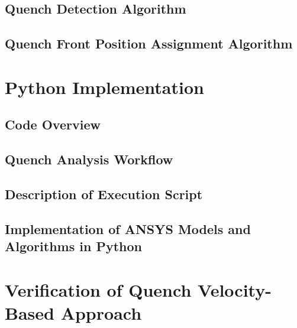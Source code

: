 \documentclass[11pt,a4paper]{report}
\begin{document}
\section{Quench Detection Algorithm}
\label{section:quench_detection_algorithm}


\section{Quench Front Position Assignment Algorithm}
\label{section:node_searching_algorithm}


\clearpage
\chapter{Python Implementation}
\label{chapter:python_implementation}

\section{Code Overview}
\label{section:code_overview}


\section{Quench Analysis Workflow}


\section{Description of Execution Script}


\section{Implementation of ANSYS Models and Algorithms in Python}
\label{section:description_main_classes}


\clearpage
\chapter{Verification of Quench Velocity-Based Approach}
\label{chapter:quench_velocity_benchmarking}
\end{document}
